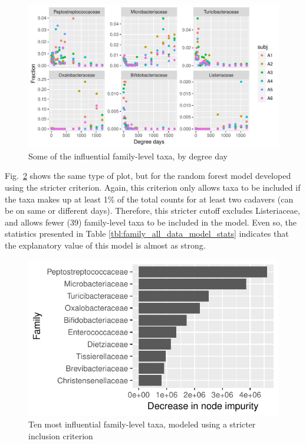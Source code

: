 \documentclass{article}
\begin{document}
\begin{figure}
  \centering
  \includegraphics{../../only_families/all_time_steps/influential_family_taxa_panel}
  \caption{Some of the influential family-level taxa, by degree day}
  \label{fig:scatter_family_taxa}
\end{figure}

Fig.~\ref{fig:infl_family_taxa_stric_crit} shows the same type of
plot, but for the random forest model developed using the stricter
criterion.  Again, this criterion only allows taxa to be included if
the taxa makes up at least 1\% of the total counts for at least two
cadavers (can be on same or different days).  Therefore, this stricter
cutoff excludes Listeriaceae, and allows fewer (39) family-level taxa
to be included in the model.  Even so, the statistics presented in
Table \ref{tbl:family_all_data_model_stats} indicates that the
explanatory value of this model is almost as strong.

\begin{figure}
  \centering
  \includegraphics{../../only_families/all_time_steps/hit_1perc_twice/orig_units_all_data_families_barchart}
  \caption{Ten most influential family-level taxa, modeled using a stricter inclusion criterion}
  \label{fig:infl_family_taxa_stric_crit}
\end{figure}
\end{document}
